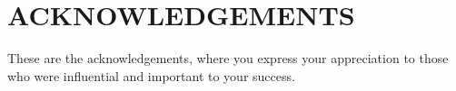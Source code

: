 \chapter*{ACKNOWLEDGEMENTS}

These are the acknowledgements, where you express your appreciation to those who were influential and important to your success.